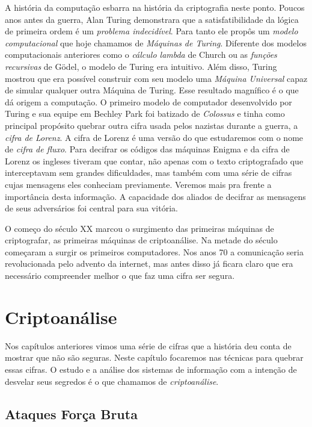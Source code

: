 A história da computação esbarra na história da criptografia neste ponto.
Poucos anos antes da guerra, Alan Turing demonstrara que a satisfatibilidade da lógica de primeira ordem é um {\em problema indecidível}.
Para tanto ele propôs um {\em modelo computacional} que hoje chamamos de {\em Máquinas de Turing}.
Diferente dos modelos computacionais anteriores como o {\em cálculo lambda} de Church ou as {\em funções recursivas} de Gödel, o modelo de Turing era intuitivo.
Além disso, Turing mostrou que era possível construir com seu modelo uma {\em Máquina Universal} capaz de simular qualquer outra Máquina de Turing.
Esse resultado magnífico é o que dá origem a computação.
O primeiro modelo de computador desenvolvido por Turing e sua equipe em Bechley Park foi batizado de {\em Colossus} e tinha como principal propósito quebrar outra cifra usada pelos nazistas durante a guerra, a {\em cifra de Lorenz}.
A cifra de Lorenz é uma versão do que estudaremos com o nome de {\em cifra de fluxo}.
Para decifrar os códigos das máquinas Enigma e da cifra de Lorenz os ingleses tiveram que contar, não apenas com o texto criptografado que interceptavam sem grandes dificuldades, mas também com uma série de cifras cujas mensagens eles conheciam previamente.
Veremos mais pra frente a importância desta informação.
A capacidade dos aliados de decifrar as mensagens de seus adversários foi central para sua vitória.

O começo do século XX marcou o surgimento das primeiras máquinas de criptografar, as primeiras máquinas de criptoanálise.
Na metade do século começaram a surgir os primeiros computadores.
Nos anos 70 a comunicação seria revolucionada pelo advento da internet, mas antes disso já ficara claro que era necessário compreender melhor o que faz uma cifra ser segura.


\section{Criptoanálise}
\label{sec:criptoanalise}

Nos capítulos anteriores vimos uma série de cifras que a história deu conta de mostrar que não são seguras.
Neste capítulo focaremos nas técnicas para quebrar essas cifras.
O estudo e a análise dos sistemas de informação com a intenção de desvelar seus segredos é o que chamamos de {\em criptoanálise}.

\subsection{Ataques Força Bruta}
\label{sec:forca-bruta}

